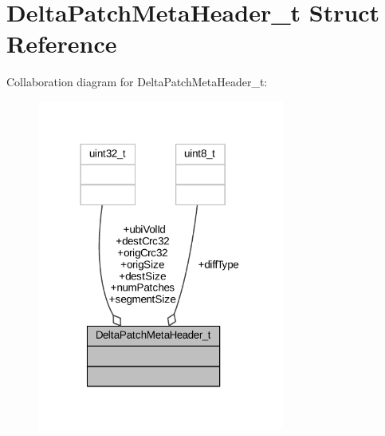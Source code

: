 \hypertarget{struct_delta_patch_meta_header__t}{}\section{Delta\+Patch\+Meta\+Header\+\_\+t Struct Reference}
\label{struct_delta_patch_meta_header__t}


Collaboration diagram for Delta\+Patch\+Meta\+Header\+\_\+t\+:
\nopagebreak
\begin{figure}[H]
\begin{center}
\leavevmode
\includegraphics[width=230pt]{struct_delta_patch_meta_header__t__coll__graph}
\end{center}
\end{figure}
